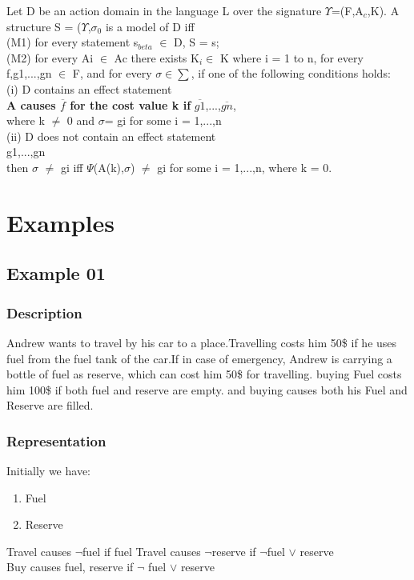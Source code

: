 \documentclass[11pt]{article}
\begin{document}
Let D be an action domain in the language L over the signature $\Upsilon$=(F,A$_{c}$,K). A structure S = ($\Upsilon$,$\sigma_{0}$ is a model of D iff\\
(M1) for every statement s$_{beta}$ $\in$ D, S \textbar= s;\\
(M2) for every Ai $\in$ Ac there exists K$_{i} \in$ K where i = 1 to n, for every f,g1,...,gn $\in$ F, and for every $\sigma\in\sum$, if one of the following conditions holds:
\\\indent
(i) D contains an effect statement\\
\indent\indent 
{\bfseries A causes $\overline{f}$ for the cost value k if} $\overline{g1}$,...,$\overline{gn}$,\\
\indent where k $\neq$ 0 and $\sigma$\textbar=  gi for some i = 1,...,n\\
\indent(ii) D does not contain an effect statement\\
\indent{} g1,...,gn\\
\indent then $\sigma$ \textbar$\neq$ gi iff $\Psi$(A(k),$\sigma$) \textbar$\neq$ gi for some i = 1,...,n, where k = 0.\\

	\section{Examples}\label{sec:Examples}
	\subsection{Example 01}\label{example:ex01}
	\subsubsection{Description}\label{par:p101}
	Andrew wants to travel by his car to a place.Travelling costs him 50\$ if he uses fuel from the fuel tank of the car.If in case of emergency, Andrew is carrying a bottle of fuel as reserve, which can cost him 50\$ for travelling. buying Fuel costs him 100\$ if both fuel and reserve are empty. and buying causes both his Fuel and Reserve are filled. 
	\subsubsection{Representation}\label{par:p201}
	Initially we have:
	\begin{enumerate}
		\item Fuel
		\item Reserve
	\end{enumerate}
	Travel causes $\neg$fuel if fuel %
	Travel causes $\neg$reserve if $\neg$fuel $\vee$ reserve\\
	Buy causes fuel, reserve  if $\neg$ fuel $\vee$ reserve\\
\end{document}
